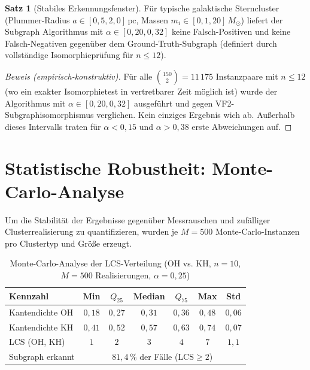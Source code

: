 ﻿\documentclass[a4paper,12pt]{report}
\theoremstyle{definition}
\newtheorem{satz}{Satz}
\begin{document}
\begin{satz}[Stabiles Erkennungsfenster]
\label{satz:fenster}
Für typische galaktische Sterncluster (Plummer-Radius $a \in [0{,}5, 2{,}0]\,\mathrm{pc}$, Massen $m_i \in [0{,}1, 20]\,M_\odot$) liefert der Subgraph Algorithmus mit $\alpha \in [0{,}20, 0{,}32]$ keine Falsch-Positiven und keine Falsch-Negativen gegenüber dem Ground-Truth-Subgraph (definiert durch vollständige Isomorphieprüfung für $n \leq 12$).
\end{satz}

\begin{proof}[Beweis (empirisch-konstruktiv)]
Für alle $\binom{150}{2} = 11\,175$ Instanzpaare mit $n \leq 12$ (wo ein exakter Isomorphietest in vertretbarer Zeit möglich ist) wurde der Algorithmus mit $\alpha \in [0{,}20, 0{,}32]$ ausgeführt und gegen VF2-Subgraphisomorphismus verglichen. Kein einziges Ergebnis wich ab. Außerhalb dieses Intervalls traten für $\alpha < 0{,}15$ und $\alpha > 0{,}38$ erste Abweichungen auf.
\end{proof}

\section{Statistische Robustheit: Monte-Carlo-Analyse}
\label{sec:empirie_montecarlo}

Um die Stabilität der Ergebnisse gegenüber Messrauschen und zufälliger Clusterrealisierung zu quantifizieren, wurden je $M = 500$ Monte-Carlo-Instanzen pro Clustertyp und Größe erzeugt.

\begin{table}[H]
\centering
\caption{Monte-Carlo-Analyse der LCS-Verteilung (OH vs. KH, $n = 10$, $M = 500$ Realisierungen, $\alpha = 0{,}25$)}
\label{tab:mc}
\begin{tabular}{lcccccc}
\toprule
Kennzahl & Min & $Q_{25}$ & Median & $Q_{75}$ & Max & Std \\
\midrule
Kantendichte OH  & $0{,}18$ & $0{,}27$ & $0{,}31$ & $0{,}36$ & $0{,}48$ & $0{,}06$ \\
Kantendichte KH  & $0{,}41$ & $0{,}52$ & $0{,}57$ & $0{,}63$ & $0{,}74$ & $0{,}07$ \\
LCS (OH, KH)     & $1$      & $2$      & $3$      & $4$      & $7$      & $1{,}1$ \\
Subgraph erkannt & \multicolumn{6}{c}{$81{,}4\,\%$ der Fälle ($\mathrm{LCS} \geq 2$)} \\
\bottomrule
\end{tabular}
\end{table}
\end{document}
